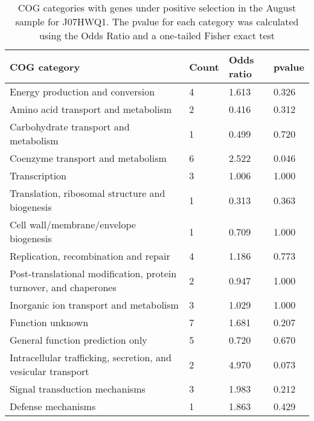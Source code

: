 \begin{table}[hb]
\footnotesize 
	\tabcolsep=0.11cm 
\caption{COG categories with genes under positive selection in the August sample for J07HWQ1. The pvalue for each category was calculated using the Odds Ratio and a one-tailed Fisher exact test} 
\begin{tabularx}{\textwidth}{L{6cm}R{2cm}R{2cm}R{2cm}} 
\hline 
\textbf{COG category} & \textbf{Count} & \textbf{Odds ratio} & \textbf{pvalue} \\ 
\hline 
Energy production and conversion & 4 & 1.613 & 0.326 \\ 
Amino acid transport and metabolism & 2 & 0.416 & 0.312 \\ 
Carbohydrate transport and metabolism & 1 & 0.499 & 0.720 \\ 
Coenzyme transport and metabolism & 6 & 2.522 & 0.046 \\ 
Transcription & 3 & 1.006 & 1.000 \\ 
Translation, ribosomal structure and biogenesis & 1 & 0.313 & 0.363 \\ 
Cell wall/membrane/envelope biogenesis & 1 & 0.709 & 1.000 \\ 
Replication, recombination and repair & 4 & 1.186 & 0.773 \\ 
Post-translational modification, protein turnover, and chaperones & 2 & 0.947 & 1.000 \\ 
Inorganic ion transport and metabolism & 3 & 1.029 & 1.000 \\ 
Function unknown & 7 & 1.681 & 0.207 \\ 
General function prediction only & 5 & 0.720 & 0.670 \\ 
Intracellular trafficking, secretion, and vesicular transport & 2 & 4.970 & 0.073 \\ 
Signal transduction mechanisms & 3 & 1.983 & 0.212 \\ 
Defense mechanisms & 1 & 1.863 & 0.429 \\ 
\end{tabularx} 
\label{August_COG_Selection_J07HWQ1} 
 \end{table} 

